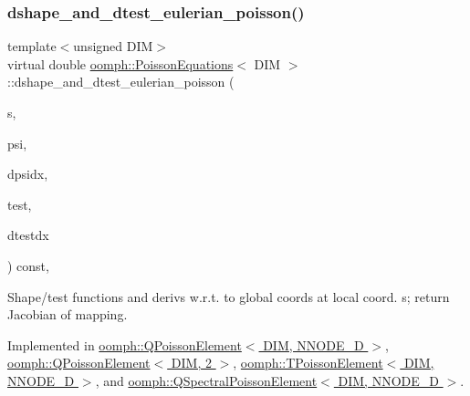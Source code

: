 \mbox{\label{classoomph_1_1PoissonEquations_a88afb41d8733fb3488754cb579f44770}} 
\subsubsection{\texorpdfstring{dshape\+\_\+and\+\_\+dtest\+\_\+eulerian\+\_\+poisson()}{dshape\_and\_dtest\_eulerian\_poisson()}}
{\footnotesize\ttfamily template$<$unsigned D\+IM$>$ \\
virtual double \hyperlink{classoomph_1_1PoissonEquations}{oomph\+::\+Poisson\+Equations}$<$ D\+IM $>$\+::dshape\+\_\+and\+\_\+dtest\+\_\+eulerian\+\_\+poisson (\begin{DoxyParamCaption}\item[{const \hyperlink{classoomph_1_1Vector}{Vector}$<$ double $>$ \&}]{s,  }\item[{\hyperlink{classoomph_1_1Shape}{Shape} \&}]{psi,  }\item[{\hyperlink{classoomph_1_1DShape}{D\+Shape} \&}]{dpsidx,  }\item[{\hyperlink{classoomph_1_1Shape}{Shape} \&}]{test,  }\item[{\hyperlink{classoomph_1_1DShape}{D\+Shape} \&}]{dtestdx }\end{DoxyParamCaption}) const\hspace{0.3cm}{\ttfamily [protected]}, {}}



Shape/test functions and derivs w.\+r.\+t. to global coords at local coord. s; return Jacobian of mapping. 



Implemented in \hyperlink{classoomph_1_1QPoissonElement_aa3ae03aec64e427b10b791acaf36ae74}{oomph\+::\+Q\+Poisson\+Element$<$ D\+I\+M, N\+N\+O\+D\+E\+\_\+D $>$}, \hyperlink{classoomph_1_1QPoissonElement_aa3ae03aec64e427b10b791acaf36ae74}{oomph\+::\+Q\+Poisson\+Element$<$ D\+I\+M, 2 $>$}, \hyperlink{classoomph_1_1TPoissonElement_aa15655fd7d9489a77b6d6c82f18946e4}{oomph\+::\+T\+Poisson\+Element$<$ D\+I\+M, N\+N\+O\+D\+E\+\_\+D $>$}, and \hyperlink{classoomph_1_1QSpectralPoissonElement_ab2600e7f60d8a8c4b5c32109e9174e8f}{oomph\+::\+Q\+Spectral\+Poisson\+Element$<$ D\+I\+M, N\+N\+O\+D\+E\+\_\+D $>$}.




